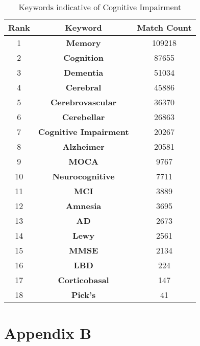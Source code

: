 \documentclass[12pt]{article}
\begin{document}
\begin{table*}[htbp] 

	{
		\begin{tabular}{c|c|c}
		\toprule
	    \textbf{Rank} & \textbf{Keyword} & \textbf{Match Count} \\
	    \midrule
	    
		1 & \textbf{Memory} & 109218 \\ 
		2 & \textbf{Cognition}  & 87655 \\ 
		3 & \textbf{Dementia} & 51034 \\ 
		4 & \textbf{Cerebral} &  45886 \\ 
		5 & \textbf{Cerebrovascular} & 36370 \\ 
		6 & \textbf{Cerebellar} & 26863 \\
		7 & \textbf{Cognitive Impairment} & 20267 \\ 
		8 & \textbf{Alzheimer} & 20581 \\ 
		9 & \textbf{MOCA} & 9767 \\ 
		10 & \textbf{Neurocognitive} & 7711 \\ 
		11 & \textbf{MCI} & 3889 \\ 
		12 & \textbf{Amnesia} & 3695 \\ 
		13 & \textbf{AD} & 2673 \\ 
		14 & \textbf{Lewy} & 2561 \\ 
		15 & \textbf{MMSE} & 2134 \\ 
		16 & \textbf{LBD} & 224 \\ 
		17 & \textbf{Corticobasal} & 147 \\ 
		18 & \textbf{Pick's} & 41 \\ 
		
	    \bottomrule
		\end{tabular}
	}
	{\caption{Keywords indicative of Cognitive Impairment}}


    
\end{table*}

\section{Appendix B}
\end{document}
